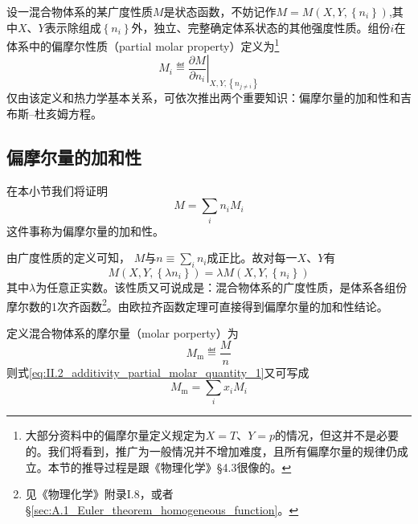 \documentclass[main.tex]{subfiles}
\begin{document}
设一混合物体系的某广度性质$M$是状态函数，不妨记作$M=M\left(X,Y,\left\{n_i\right\}\right)$,其中$X$、$Y$表示除组成$\left\{n_i\right\}$外，独立、完整确定体系状态的其他强度性质。组份$i$在体系中的偏摩尔性质（partial molar property）定义为\footnote{大部分资料中的偏摩尔量定义规定为$X=T$、$Y=p$的情况，但这并不是必要的。我们将看到，推广为一般情况并不增加难度，且所有偏摩尔量的规律仍成立。本节的推导过程是跟《物理化学》\S4.3很像的。}
\[M_i\eqdef\left.\frac{\partial M}{\partial n_i}\right|_{X,Y,\left\{n_{j\neq i}\right\}}\]
仅由该定义和热力学基本关系，可依次推出两个重要知识：偏摩尔量的加和性和吉布斯--杜亥姆方程。

\subsection{偏摩尔量的加和性}
在本小节我们将证明
\begin{equation}\label{eq:II.2_additivity_partial_molar_quantity_1}
    M=\sum_in_iM_i
\end{equation}
这件事称为偏摩尔量的加和性。

由广度性质的定义可知， $M$与$n\equiv\sum_in_i$成正比。故对每一$X$、$Y$有
\[M\left(X,Y,\left\{\lambda n_i\right\}\right)=\lambda M\left(X,Y,\left\{n_i\right\}\right)\]
其中$\lambda$为任意正实数。该性质又可说成是：混合物体系的广度性质，是体系各组份摩尔数的1次齐函数\footnote{见《物理化学》附录I.8，或者\S\ref{sec:A.1_Euler_theorem_homogeneous_function}。}。由欧拉齐函数定理可直接得到偏摩尔量的加和性结论。

定义混合物体系的摩尔量（molar porperty）为
\[M_\text{m}\eqdef \frac{M}{n}\]
则式\eqref{eq:II.2_additivity_partial_molar_quantity_1}又可写成
\begin{equation}\label{eq:II.2_additivity_partial_molar_quantity_2}
    M_\text{m}=\sum_ix_iM_i
\end{equation}
\end{document}
